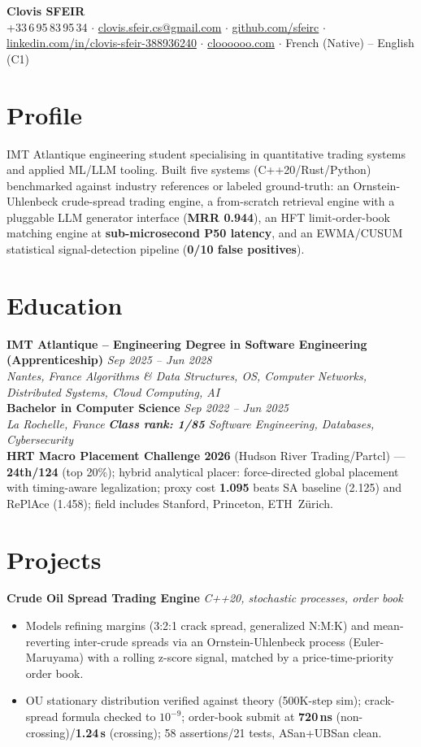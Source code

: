 \documentclass[10pt]{article}
\newcommand{\entry}[4]{%
  \noindent\textbf{#1} \hfill \textit{#2} \\
  \textit{#3} \hfill \textit{#4}\\[-0.3em]
}
\newcommand{\projectentry}[2]{%
  \noindent\textbf{#1} \hfill \textit{#2}\\[-0.3em]
}
\begin{document}
\fontsize{9.3pt}{11pt}\selectfont
\begin{center}
  {\LARGE \textbf{Clovis SFEIR}}\\[0.3em]
  +33\,6\,95\,83\,95\,34 \;$\cdot$\; \href{mailto:clovis.sfeir.cs@gmail.com}{clovis.sfeir.cs@gmail.com} \;$\cdot$\;
  \href{https://github.com/sfeirc}{github.com/sfeirc} \;$\cdot$\;
  \href{https://linkedin.com/in/clovis-sfeir-388936240}{linkedin.com/in/clovis-sfeir-388936240} \;$\cdot$\;
  \href{https://cloooooo.com}{cloooooo.com} \;$\cdot$\; French (Native) -- English (C1)
\end{center}

\section*{Profile}
IMT Atlantique engineering student specialising in quantitative trading systems and applied ML/LLM tooling. Built five systems (C++20/Rust/Python) benchmarked against industry references or labeled ground-truth: an Ornstein-Uhlenbeck crude-spread trading engine, a from-scratch retrieval engine with a pluggable LLM generator interface (\textbf{MRR 0.944}), an HFT limit-order-book matching engine at \textbf{sub-microsecond P50 latency}, and an EWMA/CUSUM statistical signal-detection pipeline (\textbf{0/10 false positives}).

\section*{Education}
\entry{IMT Atlantique -- Engineering Degree in Software Engineering (Apprenticeship)}{Sep 2025 -- Jun 2028}{Nantes, France}{Algorithms \& Data Structures, OS, Computer Networks, Distributed Systems, Cloud Computing, AI}
\entry{Bachelor in Computer Science}{Sep 2022 -- Jun 2025}{La Rochelle, France}{\textbf{Class rank: 1/85} \textbar{} Software Engineering, Databases, Cybersecurity}
\noindent\textbf{HRT Macro Placement Challenge 2026} (Hudson River Trading/Partcl) --- \textbf{24th/124} (top 20\%); hybrid analytical placer: force-directed global placement with timing-aware legalization; proxy cost \textbf{1.095} beats SA baseline (2.125) and RePlAce (1.458); field includes Stanford, Princeton, ETH~Z\"urich.

\section*{Projects}

\projectentry{Crude Oil Spread Trading Engine}{C++20, stochastic processes, order book}
\begin{itemize}
  \item Models refining margins (3:2:1 crack spread, generalized N:M:K) and mean-reverting inter-crude spreads via an Ornstein-Uhlenbeck process (Euler-Maruyama) with a rolling z-score signal, matched by a price-time-priority order book.
  \item OU stationary distribution verified against theory (500K-step sim); crack-spread formula checked to $10^{-9}$; order-book submit at \textbf{720\,ns} (non-crossing)/\textbf{1.24\,\textmu s} (crossing); 58 assertions/21 tests, ASan+UBSan clean.
\end{itemize}
\end{document}
